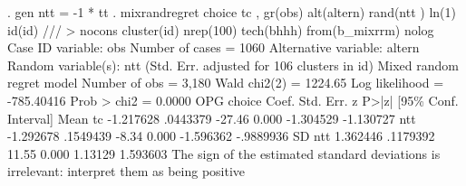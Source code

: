 . gen ntt = -1 * tt
{\smallskip}
. mixrandregret choice  tc , gr(obs) alt(altern) rand(ntt ) ln(1) id(id) ///
> nocons cluster(id)  nrep(100) tech(bhhh) from(b_mixrrm) nolog
{\smallskip}
Case ID variable: obs                          Number of cases    =       1060
Alternative variable: altern                   
Random variable(s): ntt                        
{\smallskip}
                                 (Std. Err. adjusted for  106 clusters in id)
{\smallskip}
Mixed random regret model                       Number of obs     =      3,180
                                                Wald chi2(2)      =    1224.65
Log likelihood = -785.40416                     Prob > chi2       =     0.0000
{\smallskip}
             {\VBAR}                 OPG
      choice {\VBAR}      Coef.   Std. Err.      z    P>|z|     [95\% Conf. Interval]
Mean         {\VBAR}
          tc {\VBAR}  -1.217628   .0443379   -27.46   0.000    -1.304529   -1.130727
         ntt {\VBAR}  -1.292678   .1549439    -8.34   0.000    -1.596362   -.9889936
SD           {\VBAR}
         ntt {\VBAR}   1.362446   .1179392    11.55   0.000      1.13129    1.593603
{\smallskip}
The sign of the estimated standard deviations is irrelevant: interpret them as
being positive
